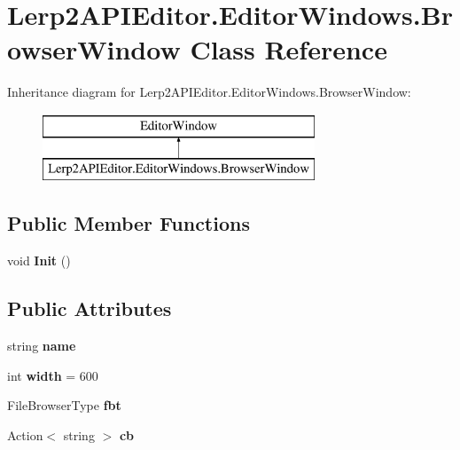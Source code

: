 \hypertarget{class_lerp2_a_p_i_editor_1_1_editor_windows_1_1_browser_window}{}\section{Lerp2\+A\+P\+I\+Editor.\+Editor\+Windows.\+Browser\+Window Class Reference}
\label{class_lerp2_a_p_i_editor_1_1_editor_windows_1_1_browser_window}
Inheritance diagram for Lerp2\+A\+P\+I\+Editor.\+Editor\+Windows.\+Browser\+Window\+:\begin{figure}[H]
\begin{center}
\leavevmode
\includegraphics[height=2.000000cm]{class_lerp2_a_p_i_editor_1_1_editor_windows_1_1_browser_window}
\end{center}
\end{figure}
\subsection*{Public Member Functions}
\begin{DoxyCompactItemize}
\item 
\mbox{\label{class_lerp2_a_p_i_editor_1_1_editor_windows_1_1_browser_window_a61c5cda8805741692922db67f1b1a788}} 
void {\bfseries Init} ()
\end{DoxyCompactItemize}
\subsection*{Public Attributes}
\begin{DoxyCompactItemize}
\item 
\mbox{\label{class_lerp2_a_p_i_editor_1_1_editor_windows_1_1_browser_window_afb60a4f95729de6c2ea9592aa94a644e}} 
string {\bfseries name}
\item 
\mbox{\label{class_lerp2_a_p_i_editor_1_1_editor_windows_1_1_browser_window_ae39ade89001edd898154cc3b7c038317}} 
int {\bfseries width} = 600
\item 
\mbox{\label{class_lerp2_a_p_i_editor_1_1_editor_windows_1_1_browser_window_a9d36b245adda6d3c118f7132035619b5}} 
File\+Browser\+Type {\bfseries fbt}
\item 
\mbox{\label{class_lerp2_a_p_i_editor_1_1_editor_windows_1_1_browser_window_a442a9bc66b634f38b58c4dabeb9fab38}} 
Action$<$ string $>$ {\bfseries cb}
\end{DoxyCompactItemize}
